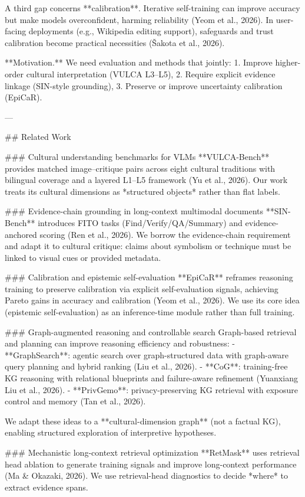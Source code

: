 A third gap concerns **calibration**. Iterative self-training can improve accuracy but make models overconfident, harming reliability (Yeom et al., 2026). In user-facing deployments (e.g., Wikipedia editing support), safeguards and trust calibration become practical necessities (Šakota et al., 2026).

**Motivation.** We need evaluation and methods that jointly:
1. Improve higher-order cultural interpretation (VULCA L3–L5),
2. Require explicit evidence linkage (SIN-style grounding),
3. Preserve or improve uncertainty calibration (EpiCaR).

---

## Related Work

### Cultural understanding benchmarks for VLMs
**VULCA-Bench** provides matched image–critique pairs across eight cultural traditions with bilingual coverage and a layered L1–L5 framework (Yu et al., 2026). Our work treats its cultural dimensions as *structured objects* rather than flat labels.

### Evidence-chain grounding in long-context multimodal documents
**SIN-Bench** introduces FITO tasks (Find/Verify/QA/Summary) and evidence-anchored scoring (Ren et al., 2026). We borrow the evidence-chain requirement and adapt it to cultural critique: claims about symbolism or technique must be linked to visual cues or provided metadata.

### Calibration and epistemic self-evaluation
**EpiCaR** reframes reasoning training to preserve calibration via explicit self-evaluation signals, achieving Pareto gains in accuracy and calibration (Yeom et al., 2026). We use its core idea (epistemic self-evaluation) as an inference-time module rather than full training.

### Graph-augmented reasoning and controllable search
Graph-based retrieval and planning can improve reasoning efficiency and robustness:
- **GraphSearch**: agentic search over graph-structured data with graph-aware query planning and hybrid ranking (Liu et al., 2026).
- **CoG**: training-free KG reasoning with relational blueprints and failure-aware refinement (Yuanxiang Liu et al., 2026).
- **PrivGemo**: privacy-preserving KG retrieval with exposure control and memory (Tan et al., 2026).

We adapt these ideas to a **cultural-dimension graph** (not a factual KG), enabling structured exploration of interpretive hypotheses.

### Mechanistic long-context retrieval optimization
**RetMask** uses retrieval head ablation to generate training signals and improve long-context performance (Ma & Okazaki, 2026). We use retrieval-head diagnostics to decide *where* to extract evidence spans.


